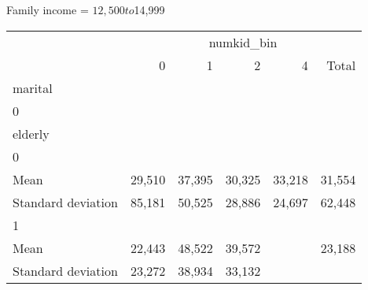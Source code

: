 Family income = $12,500 to $14,999
\begin{tabular}{llllll}
\cline{1-6}
\multicolumn{1}{c}{} &
  \multicolumn{5}{|c}{numkid\_bin} \\
\multicolumn{1}{c}{} &
  \multicolumn{1}{|r}{0} &
  \multicolumn{1}{r}{1} &
  \multicolumn{1}{r}{2} &
  \multicolumn{1}{r}{4} &
  \multicolumn{1}{r}{Total} \\
\cline{1-6}
\multicolumn{1}{l}{marital} &
  \multicolumn{1}{|r}{} &
  \multicolumn{1}{r}{} &
  \multicolumn{1}{r}{} &
  \multicolumn{1}{r}{} &
  \multicolumn{1}{r}{} \\
\multicolumn{1}{l}{\hspace{1em}0} &
  \multicolumn{1}{|r}{} &
  \multicolumn{1}{r}{} &
  \multicolumn{1}{r}{} &
  \multicolumn{1}{r}{} &
  \multicolumn{1}{r}{} \\
\multicolumn{1}{l}{\hspace{2em}elderly} &
  \multicolumn{1}{|r}{} &
  \multicolumn{1}{r}{} &
  \multicolumn{1}{r}{} &
  \multicolumn{1}{r}{} &
  \multicolumn{1}{r}{} \\
\multicolumn{1}{l}{\hspace{3em}0} &
  \multicolumn{1}{|r}{} &
  \multicolumn{1}{r}{} &
  \multicolumn{1}{r}{} &
  \multicolumn{1}{r}{} &
  \multicolumn{1}{r}{} \\
\multicolumn{1}{l}{\hspace{4em}Mean} &
  \multicolumn{1}{|r}{29,510} &
  \multicolumn{1}{r}{37,395} &
  \multicolumn{1}{r}{30,325} &
  \multicolumn{1}{r}{33,218} &
  \multicolumn{1}{r}{31,554} \\
\multicolumn{1}{l}{\hspace{4em}Standard deviation} &
  \multicolumn{1}{|r}{85,181} &
  \multicolumn{1}{r}{50,525} &
  \multicolumn{1}{r}{28,886} &
  \multicolumn{1}{r}{24,697} &
  \multicolumn{1}{r}{62,448} \\
\multicolumn{1}{l}{\hspace{3em}1} &
  \multicolumn{1}{|r}{} &
  \multicolumn{1}{r}{} &
  \multicolumn{1}{r}{} &
  \multicolumn{1}{r}{} &
  \multicolumn{1}{r}{} \\
\multicolumn{1}{l}{\hspace{4em}Mean} &
  \multicolumn{1}{|r}{22,443} &
  \multicolumn{1}{r}{48,522} &
  \multicolumn{1}{r}{39,572} &
  \multicolumn{1}{r}{} &
  \multicolumn{1}{r}{23,188} \\
\multicolumn{1}{l}{\hspace{4em}Standard deviation} &
  \multicolumn{1}{|r}{23,272} &
  \multicolumn{1}{r}{38,934} &
  \multicolumn{1}{r}{33,132} &

\end{tabular}
